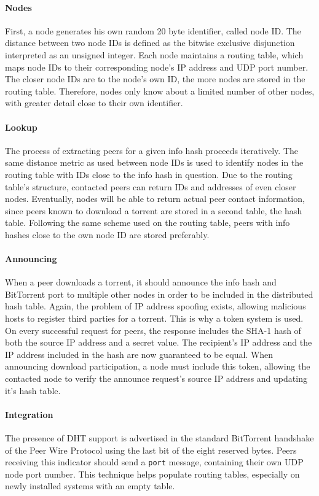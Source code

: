 \documentclass[10pt, a4paper, twoside]{scrartcl}
\renewcommand{\_}{\origunderscore\allowbreak}
\begin{document}
\paragraph{Nodes}
First, a node generates his own random 20 byte identifier, called node ID. The distance between two node IDs is defined as the bitwise exclusive disjunction interpreted as an unsigned integer. Each node maintains a routing table, which maps node IDs to their corresponding node's IP address and UDP port number. The closer node IDs are to the node's own ID, the more nodes are stored in the routing table. Therefore, nodes only know about a limited number of other nodes, with greater detail close to their own identifier.

\paragraph{Lookup}
The process of extracting peers for a given info hash proceeds iteratively. The same distance metric as used between node IDs is used to identify nodes in the routing table with IDs close to the info hash in question. Due to the routing table's structure, contacted peers can return IDs and addresses of even closer nodes. Eventually, nodes will be able to return actual peer contact information, since peers known to download a torrent are stored in a second table, the hash table. Following the same scheme used on the routing table, peers with info hashes close to the own node ID are stored preferably.

\paragraph{Announcing}
When a peer downloads a torrent, it should announce the info hash and BitTorrent port to multiple other nodes in order to be included in the distributed hash table. Again, the problem of IP address spoofing exists, allowing malicious hosts to register third parties for a torrent. This is why a token system is used. On every successful request for peers, the response includes the SHA-1 hash of both the source IP address and a secret value. The recipient's IP address and the IP address included in the hash are now guaranteed to be equal. When announcing download participation, a node must include this token, allowing the contacted node to verify the announce request's source IP address and updating it's hash table.

\paragraph{Integration}
The presence of DHT support is advertised in the standard BitTorrent handshake of the Peer Wire Protocol using the last bit of the eight reserved bytes. Peers receiving this indicator should send a \texttt{port} message, containing their own UDP node port number. This technique helps populate routing tables, especially on newly installed systems with an empty table.
\end{document}
